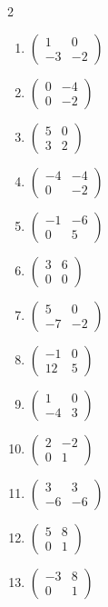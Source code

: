\begin{multicols}{2}
\begin{enumerate}[label=\arabic*., leftmargin=*]
\item $\begin{pmatrix}1 & 0\\ -3 & -2\end{pmatrix}$
\item $\begin{pmatrix}0 & -4\\ 0 & -2\end{pmatrix}$
\item $\begin{pmatrix}5 & 0\\ 3 & 2\end{pmatrix}$
\item $\begin{pmatrix}-4 & -4\\ 0 & -2\end{pmatrix}$
\item $\begin{pmatrix}-1 & -6\\ 0 & 5\end{pmatrix}$
\item $\begin{pmatrix}3 & 6\\ 0 & 0\end{pmatrix}$
\item $\begin{pmatrix}5 & 0\\ -7 & -2\end{pmatrix}$
\item $\begin{pmatrix}-1 & 0\\ 12 & 5\end{pmatrix}$
\item $\begin{pmatrix}1 & 0\\ -4 & 3\end{pmatrix}$
\item $\begin{pmatrix}2 & -2\\ 0 & 1\end{pmatrix}$
\item $\begin{pmatrix}3 & 3\\ -6 & -6\end{pmatrix}$
\item $\begin{pmatrix}5 & 8\\ 0 & 1\end{pmatrix}$
\item $\begin{pmatrix}-3 & 8\\ 0 & 1\end{pmatrix}$

\end{enumerate}
\end{multicols}
